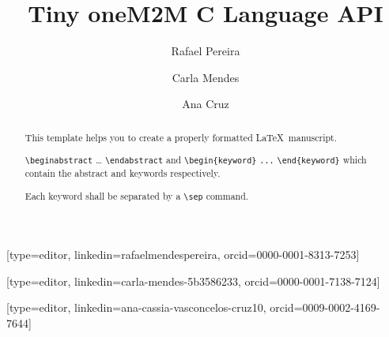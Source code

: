 \documentclass[a4paper,fleqn]{cas-dc}
\begin{document}
\let\WriteBookmarks\relax
\def\floatpagepagefraction{1}
\def\textpagefraction{.001}

\title [mode = title]{Tiny oneM2M C Language API}                     


\author[1]{Rafael Pereira}[type=editor,
                        linkedin=rafaelmendespereira,
                        orcid=0000-0001-8313-7253]

\author[1]{Carla Mendes}[type=editor,
                        linkedin=carla-mendes-5b3586233,
                        orcid=0000-0001-7138-7124]

\author[1]{Ana Cruz}[type=editor,
linkedin=ana-cassia-vasconcelos-cruz10,
orcid=0009-0002-4169-7644]

\address[1]{Computer Science and Communications Research Centre, School of Technology and Management, Polytechnic of Leiria, 2411-901 Leiria, Portugal}

\begin{abstract}
This template helps you to create a properly formatted \LaTeX\ manuscript.

\noindent\texttt{\textbackslash begin{abstract}} \dots 
\texttt{\textbackslash end{abstract}} and
\verb+\begin{keyword}+ \verb+...+ \verb+\end{keyword}+ 
which
contain the abstract and keywords respectively. 

\noindent Each keyword shall be separated by a \verb+\sep+ command.
\end{abstract}

%
\end{document}
